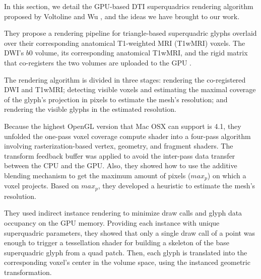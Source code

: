 \documentclass[twoside,twocolumn,10pt]{article}
\begin{document}
In this section, we detail the GPU-based DTI superquadrics rendering algorithm proposed by Voltoline and Wu \cite{voltoline2021}, and the ideas we have brought to our work.

They propose a rendering pipeline for triangle-based superquadric glyphs overlaid over their corresponding anatomical T1-weighted MRI (T1wMRI) voxels. The DWI's $b0$ volume, its corresponding anatomical T1wMRI, and the rigid matrix that co-registers the two volumes are uploaded to the GPU \cite{ting2014}.



The rendering algorithm is divided in three stages: rendering the co-registered DWI and T1wMRI; detecting visible voxels and estimating the maximal coverage of the glyph's projection in pixels to estimate the mesh's resolution; and rendering the visible glyphs in the estimated resolution. %

Because the highest OpenGL version that Mac OSX can support is 4.1, they unfolded the one-pass voxel coverage compute shader into a four-pass algorithm involving rasterization-based vertex, geometry, and fragment shaders. The transform feedback buffer was applied to avoid the inter-pass data transfer between the CPU and the GPU. Also, they showed how to use the additive blending mechanism to get the maximum amount of pixels ($max_p$) on which a voxel projects.  Based on $max_p$, they developed a heuristic to estimate the mesh's resolution.


They used indirect instance rendering to minimize draw calls and glyph data occupancy on the GPU memory. Providing each instance with unique superquadric parameters, they showed that only a single draw call of a point was enough to trigger a tessellation shader for building a skeleton of the base superquadric glyph from a quad patch. Then, each glyph is translated into the corresponding voxel's center in the volume space, using the instanced geometric transformation.
\end{document}
